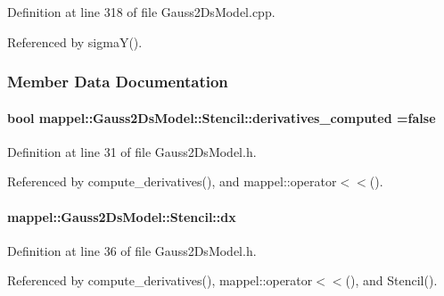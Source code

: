 Definition at line 318 of file Gauss2\+Ds\+Model.\+cpp.



Referenced by sigma\+Y().



\subsubsection{Member Data Documentation}
\paragraph[{\texorpdfstring{derivatives\+\_\+computed}{derivatives_computed}}]{\setlength{\rightskip}{0pt plus 5cm}bool mappel\+::\+Gauss2\+Ds\+Model\+::\+Stencil\+::derivatives\+\_\+computed =false}\hypertarget{classmappel_1_1Gauss2DsModel_1_1Stencil_a5b850a03436f6e189848d06e8bc1bc67}{}\label{classmappel_1_1Gauss2DsModel_1_1Stencil_a5b850a03436f6e189848d06e8bc1bc67}


Definition at line 31 of file Gauss2\+Ds\+Model.\+h.



Referenced by compute\+\_\+derivatives(), and mappel\+::operator$<$$<$().

\paragraph[{\texorpdfstring{dx}{dx}}]{ mappel\+::\+Gauss2\+Ds\+Model\+::\+Stencil\+::dx}\hypertarget{classmappel_1_1Gauss2DsModel_1_1Stencil_a044c0a62c198349e8d51c6fa36556f31}{}\label{classmappel_1_1Gauss2DsModel_1_1Stencil_a044c0a62c198349e8d51c6fa36556f31}


Definition at line 36 of file Gauss2\+Ds\+Model.\+h.



Referenced by compute\+\_\+derivatives(), mappel\+::operator$<$$<$(), and Stencil().

